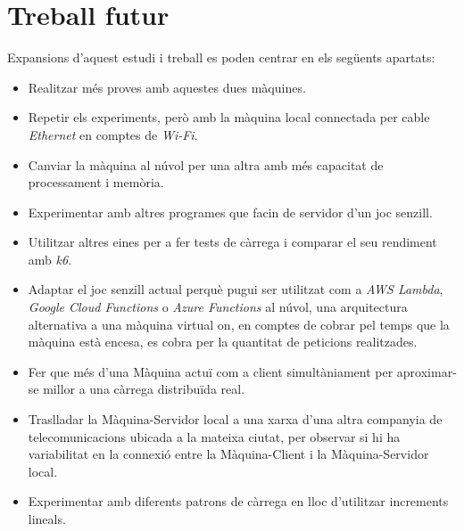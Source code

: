 \chapter{Treball futur}

Expansions d'aquest estudi i treball es poden centrar en els següents apartats: \begin{itemize} 
\item Realitzar més proves amb aquestes dues màquines. 
\item Repetir els experiments, però amb la màquina local connectada per cable \textit{Ethernet} en comptes de \textit{Wi-Fi}. 
\item Canviar la màquina al núvol per una altra amb més capacitat de processament i memòria. 
\item Experimentar amb altres programes que facin de servidor d'un joc senzill. 
\item Utilitzar altres eines per a fer tests de càrrega i comparar el seu rendiment amb \textit{k6}. 
\item Adaptar el joc senzill actual perquè pugui ser utilitzat com a \textit{AWS Lambda}, \textit{Google Cloud Functions} o \textit{Azure Functions} al núvol, una arquitectura alternativa a una màquina virtual on, en comptes de cobrar pel temps que la màquina està encesa, es cobra per la quantitat de peticions realitzades. 
\item Fer que més d'una Màquina actuï com a client simultàniament per aproximar-se millor a una càrrega distribuïda real. 
\item Traslladar la Màquina-Servidor local a una xarxa d'una altra companyia de telecomunicacions ubicada a la mateixa ciutat, per observar si hi ha variabilitat en la connexió entre la Màquina-Client i la Màquina-Servidor local. 
\item Experimentar amb diferents patrons de càrrega en lloc d'utilitzar increments lineals.
\end{itemize}